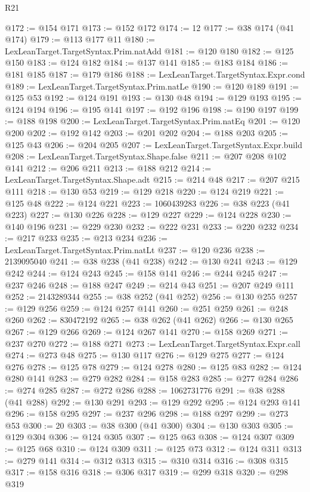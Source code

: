 \begin{lexlean}{R21}
\begin{coremodule}
@172 := @154 @171
@173 := @152 @172
@174 := 12
@177 := @38 @174 (@41 @174)
@179 := @113 @177 @11
@180 := LexLeanTarget.TargetSyntax.Prim.natAdd
@181 := @120 @180
@182 := @125 @150
@183 := @124 @182
@184 := @137 @141
@185 := @183 @184
@186 := @181 @185
@187 := @179 @186
@188 := LexLeanTarget.TargetSyntax.Expr.cond
@189 := LexLeanTarget.TargetSyntax.Prim.natLe
@190 := @120 @189
@191 := @125 @53
@192 := @124 @191
@193 := @130 @48
@194 := @129 @193
@195 := @124 @194
@196 := @195 @141
@197 := @192 @196
@198 := @190 @197
@199 := @188 @198
@200 := LexLeanTarget.TargetSyntax.Prim.natEq
@201 := @120 @200
@202 := @192 @142
@203 := @201 @202
@204 := @188 @203
@205 := @125 @43
@206 := @204 @205
@207 := LexLeanTarget.TargetSyntax.Expr.build
@208 := LexLeanTarget.TargetSyntax.Shape.false
@211 := @207 @208 @102 @141
@212 := @206 @211
@213 := @188 @212
@214 := LexLeanTarget.TargetSyntax.Shape.adt
@215 := @214 @48
@217 := @207 @215 @111
@218 := @130 @53
@219 := @129 @218
@220 := @124 @219
@221 := @125 @48
@222 := @124 @221
@223 := 1060439283
@226 := @38 @223 (@41 @223)
@227 := @130 @226
@228 := @129 @227
@229 := @124 @228
@230 := @140 @196
@231 := @229 @230
@232 := @222 @231
@233 := @220 @232
@234 := @217 @233
@235 := @213 @234
@236 := LexLeanTarget.TargetSyntax.Prim.natLt
@237 := @120 @236
@238 := 2139095040
@241 := @38 @238 (@41 @238)
@242 := @130 @241
@243 := @129 @242
@244 := @124 @243
@245 := @158 @141
@246 := @244 @245
@247 := @237 @246
@248 := @188 @247
@249 := @214 @43
@251 := @207 @249 @111
@252 := 2143289344
@255 := @38 @252 (@41 @252)
@256 := @130 @255
@257 := @129 @256
@259 := @124 @257 @141
@260 := @251 @259
@261 := @248 @260
@262 := 830472192
@265 := @38 @262 (@41 @262)
@266 := @130 @265
@267 := @129 @266
@269 := @124 @267 @141
@270 := @158 @269
@271 := @237 @270
@272 := @188 @271
@273 := LexLeanTarget.TargetSyntax.Expr.call
@274 := @273 @48
@275 := @130 @117
@276 := @129 @275
@277 := @124 @276
@278 := @125 @78
@279 := @124 @278
@280 := @125 @83
@282 := @124 @280 @141
@283 := @279 @282
@284 := @158 @283
@285 := @277 @284
@286 := @274 @285
@287 := @272 @286
@288 := 1062731776
@291 := @38 @288 (@41 @288)
@292 := @130 @291
@293 := @129 @292
@295 := @124 @293 @141
@296 := @158 @295
@297 := @237 @296
@298 := @188 @297
@299 := @273 @53
@300 := 20
@303 := @38 @300 (@41 @300)
@304 := @130 @303
@305 := @129 @304
@306 := @124 @305
@307 := @125 @63
@308 := @124 @307
@309 := @125 @68
@310 := @124 @309
@311 := @125 @73
@312 := @124 @311
@313 := @279 @141
@314 := @312 @313
@315 := @310 @314
@316 := @308 @315
@317 := @158 @316
@318 := @306 @317
@319 := @299 @318
@320 := @298 @319

\end{coremodule}
\end{lexlean}
